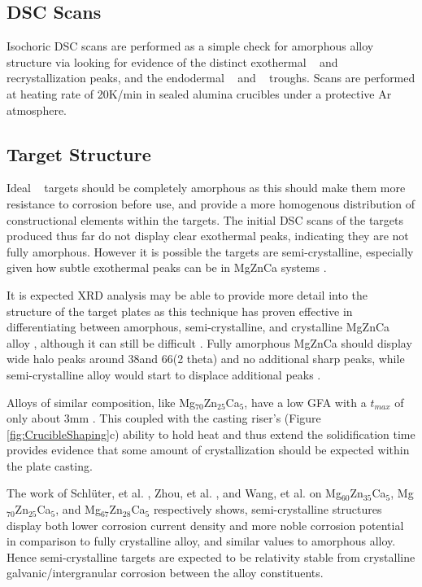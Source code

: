 \documentclass[draft,a4paper,12pt,oneside]{report}%
\begin{document}
\subsection{DSC Scans}
Isochoric DSC scans are performed as a simple check for amorphous alloy structure via looking for evidence of the distinct exothermal \Tg~ and \Tx~ recrystallization peaks, and the endodermal \Tm~ and \Tl~ troughs. Scans are performed at heating rate of 20K/min in sealed alumina crucibles under a protective Ar atmosphere.

\subsection{Target Structure}
Ideal \MgZnCa~ targets should be completely amorphous as this should make them more resistance to corrosion before use, and provide a more homogenous distribution of constructional elements within the targets. The initial DSC scans of the targets produced thus far do not display clear exothermal peaks, indicating they are not fully amorphous. However it is possible the targets are semi-crystalline, especially given how subtle exothermal peaks can be in MgZnCa systems \cite{Gu2010}. 

It is expected XRD analysis may be able to provide more detail into the structure of the target plates as this technique has proven effective in differentiating between amorphous, semi-crystalline, and crystalline MgZnCa alloy \cite{Schluter2012, Wang2012}, although it can still be difficult \cite{Zhou2013}. Fully amorphous MgZnCa should display wide halo peaks around 38\degree and 66\degree (2 theta) and no additional sharp peaks, while semi-crystalline alloy would start to displace additional peaks \cite{Cao2013b, Gu2005, Wang2012, Gu2010, Cao2012}. 

Alloys of similar composition, like Mg$_{70}$Zn$_{25}$Ca$_{5}$, have a low GFA with a $t_{max}$ of only about 3mm \cite{Gu2005, Zhou2013}. This coupled with the casting riser's (Figure \ref{fig:CrucibleShaping}c) ability to hold heat and thus extend the solidification time provides evidence that some amount of crystallization should be expected within the plate casting. 

The work of Schlüter, et al. \cite{Schluter2012}, Zhou, et al. \cite{Zhou2013}, and Wang, et al. \cite{Wang2012} on Mg$_{60}$Zn$_{35}$Ca$_{5}$, Mg$_{70}$Zn$_{25}$Ca$_{5}$, and Mg$_{67}$Zn$_{28}$Ca$_{5}$ respectively shows, semi-crystalline structures display both lower corrosion current density and more noble corrosion potential in comparison to fully crystalline alloy, and similar values to amorphous alloy. Hence semi-crystalline targets are expected to be relativity stable from crystalline galvanic/intergranular corrosion between the alloy constituents. 
\end{document}
